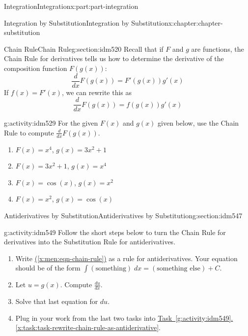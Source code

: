 \documentclass[oneside,10pt,]{book}
\newcommand{\xreffont}{\relax}
\numberwithin{equation}{section}
\begin{document}
\begin{partptx}{Integration}{}{Integration}{}{}{x:part:part-integration}
\begin{chapterptx}{Integration by Substitution}{}{Integration by Substitution}{}{}{x:chapter:chapter-substitution}
\begin{sectionptx}{Chain Rule}{}{Chain Rule}{}{}{g:section:idm520}
Recall that if \(F\) and \(g\) are functions, the Chain Rule for derivatives tells us how to determine the derivative of the composition function \(F(g(x))\):%
\begin{equation*}
\frac{d}{dx}F(g(x)) = F'(g(x))g'(x)
\end{equation*}
If \(f(x) = F'(x)\), we can rewrite this as%
\begin{equation}
\frac{d}{dx}F(g(x)) = f(g(x))g'(x)\label{x:men:eqn-chain-rule}
\end{equation}
%
\begin{activity}{}{g:activity:idm529}%
For the given \(F(x)\) and \(g(x)\) given below, use the Chain Rule to compute \(\displaystyle \frac{d}{dx}F(g(x))\).%
\begin{enumerate}[font=\bfseries,label=(\alph*),ref=\alph*]
\item{}\(F(x) = x^4\), \(g(x) = 3x^2+1\)\item{}\(F(x) = 3x^2+1\), \(g(x) = x^4\)\item{}\(F(x) = \cos(x)\), \(g(x) = x^2\)\item{}\(F(x) = x^2\), \(g(x) = \cos(x)\)\end{enumerate}
\end{activity}
\end{sectionptx}
%
%
\typeout{************************************************}
\typeout{************************************************}
%
\begin{sectionptx}{Antiderivatives by Substitution}{}{Antiderivatives by Substitution}{}{}{g:section:idm547}
\begin{activity}{}{g:activity:idm549}%
Follow the short steps below to turn the Chain Rule for derivatives into the Substitution Rule for antiderivatives.%
\begin{enumerate}[font=\bfseries,label=(\alph*),ref=\alph*]
\item\label{x:task:task-rewrite-chain-rule-as-antiderivative}Write \hyperref[x:men:eqn-chain-rule]{({\xreffont\ref{x:men:eqn-chain-rule}})} as a rule for antiderivatives. Your equation should be of the form \(\displaystyle \int (\textrm{something})\;dx = (\textrm{something else}) + C\).%
\item{}Let \(u = g(x)\). Compute \(\displaystyle \frac{du}{dx}\).%
\item{}Solve that last equation for \(du\).%
\item{}Plug in your work from the last two tasks into \hyperref[x:task:task-rewrite-chain-rule-as-antiderivative]{Task~{\xreffont\ref{g:activity:idm549}}.{\xreffont\ref{x:task:task-rewrite-chain-rule-as-antiderivative}}}.%

\end{enumerate}
\end{activity}
\end{sectionptx}
\end{chapterptx}
\end{partptx}
\end{document}
